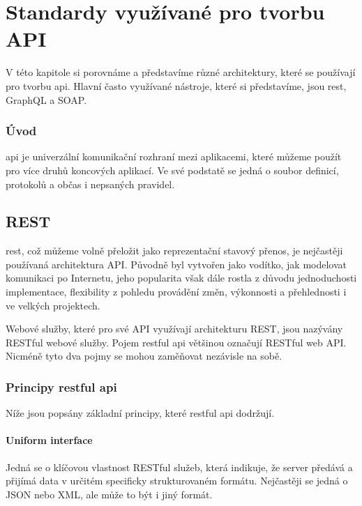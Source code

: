\chapter{Standardy využívané pro tvorbu API}\label{chap:standards}
V této kapitole si porovnáme a představíme různé architektury, které se používají pro tvorbu \gls{api}.
Hlavní často využívané nástroje, které si představíme, jsou \gls{rest}, GraphQL a SOAP.

\subsection*{Úvod}
\gls{api} je univerzální komunikační rozhraní mezi aplikacemi, které můžeme použít pro více druhů koncových aplikací. Ve své podstatě se jedná o soubor definicí, protokolů a občas i nepsaných pravidel.


\section{REST}\label{sec:rest}
\gls{rest}, což můžeme volně přeložit jako reprezentační stavový přenos, je nejčastěji používaná architektura API. Původně byl vytvořen jako vodítko, jak modelovat komunikaci po Internetu, jeho popularita však dále rostla z důvodu jednoduchosti implementace, flexibility z pohledu provádění změn, výkonnosti a přehlednosti i ve velkých projektech.

Webové služby, které pro své API využívají architekturu REST, jsou nazývány RESTful webové služby. Pojem \gls{restful api} většinou označují RESTful web API. Nicméně tyto dva pojmy se mohou zaměňovat nezávisle na sobě. \cite[]{devToApiStyles}


\subsection{Principy \gls{restful api}}\label{sec:rest:principles}

Níže jsou popsány základní principy, které \gls{restful api} dodržují.\cite{restfulApi}\cite[]{phd:restful_api}

\subsubsection*{Uniform interface}
Jedná se o klíčovou vlastnost RESTful služeb, která indikuje, že server předává a přijímá data v určitém specificky strukturovaném formátu. Nejčastěji se jedná o JSON nebo XML, ale může to být i jiný formát.

